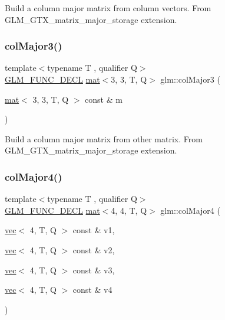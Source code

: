 Build a column major matrix from column vectors. From G\+L\+M\+\_\+\+G\+T\+X\+\_\+matrix\+\_\+major\+\_\+storage extension. \mbox{\label{group__gtx__matrix__major__storage_ga86bd0656e787bb7f217607572590af27}} 
\subsubsection{\texorpdfstring{col\+Major3()}{colMajor3()}\hspace{0.1cm}{\footnotesize\ttfamily [2/2]}}
{\footnotesize\ttfamily template$<$typename T , qualifier Q$>$ \\
\mbox{\hyperlink{setup_8hpp_ab2d052de21a70539923e9bcbf6e83a51}{G\+L\+M\+\_\+\+F\+U\+N\+C\+\_\+\+D\+E\+CL}} \mbox{\hyperlink{structglm_1_1mat}{mat}}$<$3, 3, T, Q$>$ glm\+::col\+Major3 (\begin{DoxyParamCaption}\item[{\mbox{\hyperlink{structglm_1_1mat}{mat}}$<$ 3, 3, T, Q $>$ const \&}]{m }\end{DoxyParamCaption})}

Build a column major matrix from other matrix. From G\+L\+M\+\_\+\+G\+T\+X\+\_\+matrix\+\_\+major\+\_\+storage extension. \mbox{\label{group__gtx__matrix__major__storage_gaf4aa6c7e17bfce41a6c13bf6469fab05}} 
\subsubsection{\texorpdfstring{col\+Major4()}{colMajor4()}\hspace{0.1cm}{\footnotesize\ttfamily [1/2]}}
{\footnotesize\ttfamily template$<$typename T , qualifier Q$>$ \\
\mbox{\hyperlink{setup_8hpp_ab2d052de21a70539923e9bcbf6e83a51}{G\+L\+M\+\_\+\+F\+U\+N\+C\+\_\+\+D\+E\+CL}} \mbox{\hyperlink{structglm_1_1mat}{mat}}$<$4, 4, T, Q$>$ glm\+::col\+Major4 (\begin{DoxyParamCaption}\item[{\mbox{\hyperlink{structglm_1_1vec}{vec}}$<$ 4, T, Q $>$ const \&}]{v1,  }\item[{\mbox{\hyperlink{structglm_1_1vec}{vec}}$<$ 4, T, Q $>$ const \&}]{v2,  }\item[{\mbox{\hyperlink{structglm_1_1vec}{vec}}$<$ 4, T, Q $>$ const \&}]{v3,  }\item[{\mbox{\hyperlink{structglm_1_1vec}{vec}}$<$ 4, T, Q $>$ const \&}]{v4 }\end{DoxyParamCaption})}

